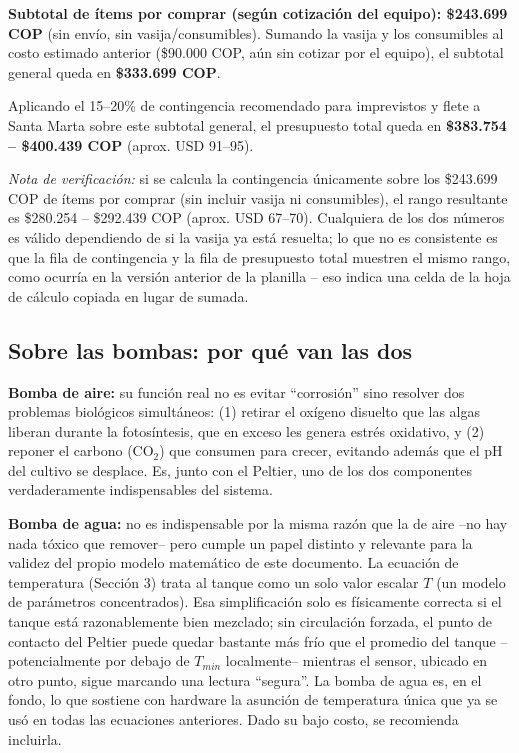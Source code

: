 \documentclass[11pt,a4paper]{article}
\begin{document}
\textbf{Subtotal de ítems por comprar (según cotización del equipo): \$243.699 COP} (sin envío, sin vasija/consumibles). Sumando la vasija y los consumibles al costo estimado anterior (\$90.000 COP, aún sin cotizar por el equipo), el subtotal general queda en \textbf{\$333.699 COP}.

Aplicando el 15--20\% de contingencia recomendado para imprevistos y flete a Santa Marta sobre este subtotal general, el presupuesto total queda en \textbf{\$383.754 -- \$400.439 COP} (aprox. USD 91--95).

\textit{Nota de verificación:} si se calcula la contingencia únicamente sobre los \$243.699 COP de ítems por comprar (sin incluir vasija ni consumibles), el rango resultante es \$280.254 -- \$292.439 COP (aprox. USD 67--70). Cualquiera de los dos números es válido dependiendo de si la vasija ya está resuelta; lo que no es consistente es que la fila de contingencia y la fila de presupuesto total muestren el mismo rango, como ocurría en la versión anterior de la planilla -- eso indica una celda de la hoja de cálculo copiada en lugar de sumada.

\subsection{Sobre las bombas: por qué van las dos}
\textbf{Bomba de aire:} su función real no es evitar ``corrosión'' sino resolver dos problemas biológicos simultáneos: (1) retirar el oxígeno disuelto que las algas liberan durante la fotosíntesis, que en exceso les genera estrés oxidativo, y (2) reponer el carbono (CO$_2$) que consumen para crecer, evitando además que el pH del cultivo se desplace. Es, junto con el Peltier, uno de los dos componentes verdaderamente indispensables del sistema.

\textbf{Bomba de agua:} no es indispensable por la misma razón que la de aire --no hay nada tóxico que remover-- pero cumple un papel distinto y relevante para la validez del propio modelo matemático de este documento. La ecuación de temperatura (Sección 3) trata al tanque como un solo valor escalar $T$ (un modelo de parámetros concentrados). Esa simplificación solo es físicamente correcta si el tanque está razonablemente bien mezclado; sin circulación forzada, el punto de contacto del Peltier puede quedar bastante más frío que el promedio del tanque --potencialmente por debajo de $T_{min}$ localmente-- mientras el sensor, ubicado en otro punto, sigue marcando una lectura ``segura''. La bomba de agua es, en el fondo, lo que sostiene con hardware la asunción de temperatura única que ya se usó en todas las ecuaciones anteriores. Dado su bajo costo, se recomienda incluirla.
\end{document}

